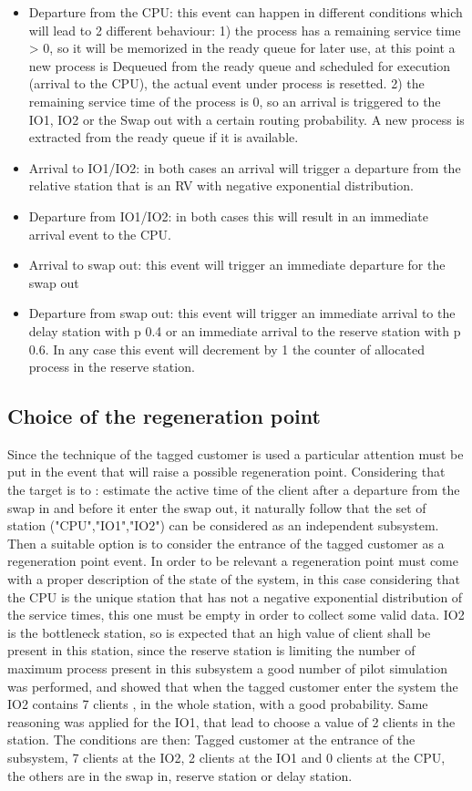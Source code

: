 \documentclass[12pt,a4paper]{article}
\begin{document}
\begin{itemize}
        \item Departure from the CPU: this event can happen in different conditions which will lead to 2 different behaviour: 1) the process has a remaining service time > 0, so it will be memorized in the ready queue for later use, at this point a new process is Dequeued from the ready queue and scheduled for execution (arrival to the CPU), the actual event under process is resetted. 2) the remaining service time of the process is 0, so an arrival is triggered to the IO1, IO2 or the Swap out with a certain routing probability. A new process is extracted from the ready queue if it is available.
        \item Arrival to IO1/IO2: in both cases an arrival will trigger a departure from the relative station that is an RV with negative exponential distribution.
        \item Departure from IO1/IO2: in both cases this will result in an immediate arrival event to the CPU. 
        \item Arrival to swap out: this event will trigger an immediate departure for the swap out 
        \item Departure from swap out: this event will trigger an immediate arrival to the delay station with p 0.4 or an immediate arrival to the reserve station with p 0.6. In any case this event will decrement by 1 the counter of allocated process in the reserve station.
    \end{itemize}

    \subsection{Choice of the regeneration point}
    Since the technique of the tagged customer is used a particular attention must be put in the event that will raise a possible regeneration point. Considering that the target is to : estimate the active time of the client after a departure from the swap in and before it enter the swap out, it naturally follow that the set of station ("CPU","IO1","IO2") can be considered as an independent subsystem. Then a suitable option is to consider the entrance of the tagged customer as a regeneration point event. In order to be relevant a regeneration point must come with a proper description of the state of the system, in this case considering that the CPU is the unique station that has not a negative exponential distribution of the service times, this one must be empty in order to collect some valid data. IO2 is the bottleneck station, so is expected that an high value of client shall be present in this station, since the reserve station is limiting the number of maximum process present in this subsystem a good number of pilot simulation was performed, and showed that when the tagged customer enter the system the IO2 contains 7 clients , in the whole station, with a good probability. Same reasoning was applied for the IO1, that lead to choose a value of 2 clients in the station. The conditions are then: Tagged customer at the entrance of the subsystem, 7 clients at the IO2, 2 clients at the IO1 and 0 clients at the CPU, the others are in the swap in, reserve station or delay station.
\end{document}

